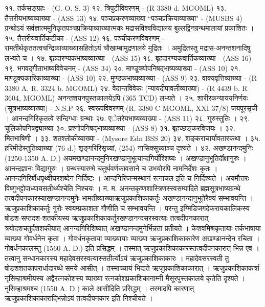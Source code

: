 ११. तर्कसङ्ग्रहः - (G. O. S. 3)
१२. त्रिपुटीविवरणम् - (R 3380 d. MGOML)
१३. तैत्तरीयभाष्यव्याख्या - (ASS 13)
१४. पञ्चप्रकरणव्याख्या ``पञ्चप्रक्रियाव्याख्या" - (MUSBS 4)
ग्रन्थोऽयं सर्वज्ञात्ममुनिकृतपञ्चप्रक्रियाव्याख्यात्मकः मद्रासविश्वविद्यालय बुल्लट्टिनग्रन्थमालायां प्रकाशितः ।
१५. तैत्तरीयवार्तिकटीका - (ASS 12)
१६. पञ्चीकरणविवरणम् -
रामतीर्थकृततत्वचन्द्रिकाव्याख्यासहितोऽयं चौखाम्बामुद्रणालये मुद्रितः । अमुद्रितस्तु मद्रास-अनन्तशनादिषु लभ्यते च ।
१७. बृहदारण्यकभाष्यव्याख्या - (ASS 15)
१८. बृहदारण्यकवार्तिकव्याख्या - (ASS 16)
१९. भगवद्गीताभाष्यविवेचनम् - (ASS 34)
२०. माण्डूक्योपनिषद्भाष्यव्याख्या - (ASS 10)
२१. माण्डूक्यकारिकाव्याख्या - (ASS 10)
२२. मुण्डकभाष्यव्याख्या - (ASS 9)
२३. वाक्यवृत्तिव्याख्या - (R 3380 A. R. 3324 b. MGOML)
२४. वेदान्तविवेकः (न्यायदीपावलीव्याख्या) - (R 4439 b. R 3604, MGOML) अनन्तशयनपुस्तकालयेऽपि (365 TCD) लभ्यते ।
२५. शारीरकन्याययनिर्णयः (सूत्रभाष्यव्याख्या) - N.S.P
२६. स्वरूपविवरणम् (R. 3380 C MGOML, XXI 37/8) जयपूरसृची ।
आनन्दगिरिकृतत्वे सन्दिग्धाः ग्रन्थाः
२७. एेतरेयभाष्यव्याख्या - (ASS 11) २८. गुरुस्तुतिः । २९. चूलिकोपनिषद्व्याख्या ३०. प्रश्नोपनिषद्भाष्यव्याख्या - (ASS 8) ३१. बृहच्छङ्करविजयः । ३२. मितभाषिणी । ३३. शतश्लोकीव्याख्या - (Mysore Edn BSS 20) ३४. शङ्कराचार्यावतारकथा । ३५. हरिमीडेस्तुतिव्याख्या (76 d.) शृङ्गरिरिसृच्यां, (254) नासिक्सूच्याञ्च दृश्यते ।
४२. अखण्डानन्दमुनिः (1250-1350 A. D.)
अयमखण्डानन्दमुनिरखण्डानुभूत्यान्दगिर्योश्शिष्यः । अखण्डानुभूतिर्दीक्षागुरुः । आनन्दज्ञानः विद्यागुरुः । ग्रन्थस्यारम्भे चतुर्थवर्णकावसाने च उभयोरपि नामनिर्देशः कृतः । आनन्दगिरिर्बोधपृथ्वीघरशब्देन निर्दिष्टः । आन्दगिरिजन्मस्थानं रत्नाचल इति च निर्दिश्यते । अयमौत्तरः विष्णुभट्टोपाध्यायसतीर्थ्यश्चेति निश्चयः ।
म. म. अनन्तकृष्णशास्त्रिणस्स्वसम्पादिते ब्रह्मसूत्रभाष्यग्रन्थे तत्वदीपनकारस्याखण्डानन्दमुनेः भामतीव्याख्याऋजुप्रकाशिकाकर्तुः अखण्डानन्दानुभूतेरैक्यं सम्भावयन्ति । ऋजुप्रकाशिकाकर्तुः गुरोः स्वयम्प्रकाशता गौणीति च सम्भावयन्ति ।
परन्तु इग्मिडिजगदेकरायकालिकस्य षोडश-सप्तदश-शतकीयस्य ऋजुप्रकाशिकाकर्तुरखण्डानन्दसरस्वत्याः तत्वदीपनकारात् त्रयोदशचतुर्दशशकीयात् आनन्दगिरिशिष्यात् अखण्डानन्दमुनेर्भिन्नता प्रतीयते । केशवमिश्रकृतायाः तर्कभाषाया व्याख्या गोवर्धनेन कृता । गोवर्धनकृताया व्याख्यायाः व्याख्या ऋजुप्रकाशिकाकारेण अखण्डानन्देन रचिता । गोवर्धनकालस्तु (1560 A. D.) इति प्रसिद्धम् । तस्मात् ऋजुप्रकाशिकाकारस्तत्वदीपनकारात् भिन्न एव । तत्वानु सन्धानकारस्य महादेवसरस्वत्यास्सतीर्त्योऽयं ऋजुप्रकाशिकाकारः । महादेवसरस्वती तु षोडशशतकापरार्धादारब्धे समये आसीत् । तस्माच्चायं भिद्यते ऋजुप्रकाशिकाकारात् । ऋजुप्रकाशिकाकर्त्रा नृसिम्हाश्रमीयस्य अद्वैरत्नकोशस्य व्याख्या रत्नकोशप्रकाशिकानाम्नी मैसूरपुस्तकालये कृतेति दृश्यते । नृसिम्हाश्रमश्च (1550 A. D.) काले आसीदिति प्रसिद्धम् । तस्मादपि कारणात् ऋजुप्रकाशिकाकाराद्भिन्नोऽयं तत्वदीपनकार इति निश्चीयते ।
